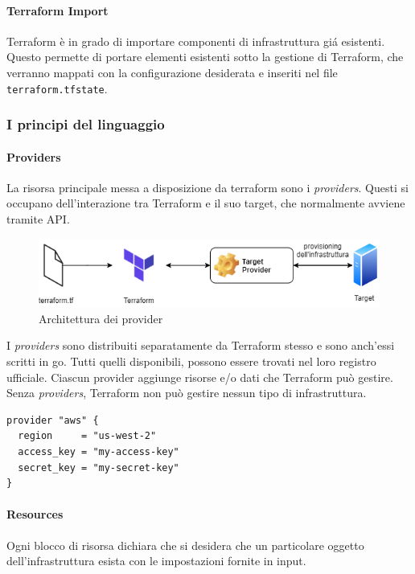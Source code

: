 \documentclass[12pt, a4paper, titlepage]{article}
\newenvironment{code}{\captionsetup{type=listing}}{}
\begin{document}
\paragraph{Terraform Import}
Terraform è in grado di importare componenti di infrastruttura giá esistenti. Questo permette di portare elementi esistenti sotto la gestione di Terraform, che verranno mappati con la configurazione desiderata e inseriti nel file \texttt{terraform.tfstate}.

\subsubsection{I principi del linguaggio}

\paragraph{Providers}
La risorsa principale messa a disposizione da terraform sono i \textit{providers}. Questi si occupano dell'interazione tra Terraform e il suo target, che normalmente avviene tramite API.

\begin{figure}[ht!]
	\centering
	\includegraphics[width=120mm]{./img/provider.png}
	\caption{Architettura dei provider}
	\label{fig:provider-architecture}
\end{figure}

I \textit{providers} sono distribuiti separatamente da Terraform stesso e sono anch'essi scritti in \gls{go}. Tutti quelli disponibili, possono essere trovati nel loro registro ufficiale\cite{terraform_registry}. Ciascun provider aggiunge risorse e/o dati che Terraform può gestire. Senza \textit{providers}, Terraform non può gestire nessun tipo di infrastruttura.

 \begin{code}
	\begin{verbatim}
provider "aws" {
  region     = "us-west-2"
  access_key = "my-access-key"
  secret_key = "my-secret-key"
}
	\end{verbatim}
\end{code}

\paragraph{Resources}
Ogni blocco di risorsa dichiara che si desidera che un particolare oggetto dell'infrastruttura esista con le impostazioni fornite in input.
\end{document}
